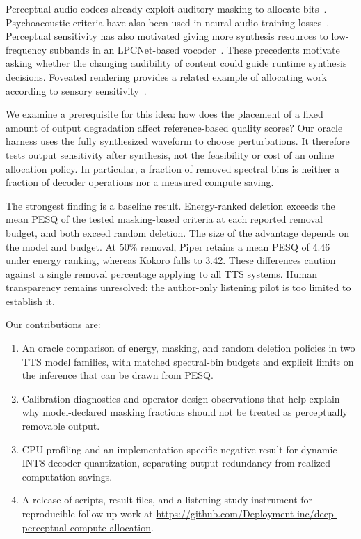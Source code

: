 \documentclass[11pt,a4paper]{article}
\newcommand{\repourl}{https://github.com/Deployment-inc/deep-perceptual-compute-allocation}
\begin{document}
Perceptual audio codecs already exploit auditory masking to allocate bits~\cite{iso11172,painter2000perceptual,zwicker2007psychoacoustics}. Psychoacoustic criteria have also been used in neural-audio training losses~\cite{zhen2018psychoacoustically,zhen2020calibration}. Perceptual sensitivity has also motivated giving more synthesis resources to low-frequency subbands in an LPCNet-based vocoder~\cite{cui2020subband}. These precedents motivate asking whether the changing audibility of content could guide runtime synthesis decisions. Foveated rendering provides a related example of allocating work according to sensory sensitivity~\cite{guenter2012foveated,patney2016foveated,kaplanyan2019deepfovea}.

We examine a prerequisite for this idea: how does the placement of a fixed amount of output degradation affect reference-based quality scores? Our oracle harness uses the fully synthesized waveform to choose perturbations. It therefore tests output sensitivity after synthesis, not the feasibility or cost of an online allocation policy. In particular, a fraction of removed spectral bins is neither a fraction of decoder operations nor a measured compute saving.

The strongest finding is a baseline result. Energy-ranked deletion exceeds the mean PESQ of the tested masking-based criteria at each reported removal budget, and both exceed random deletion. The size of the advantage depends on the model and budget. At 50\% removal, Piper retains a mean PESQ of 4.46 under energy ranking, whereas Kokoro falls to 3.42. These differences caution against a single removal percentage applying to all TTS systems. Human transparency remains unresolved: the author-only listening pilot is too limited to establish it.

Our contributions are:
\begin{enumerate}[leftmargin=*]
\item An oracle comparison of energy, masking, and random deletion policies in two TTS model families, with matched spectral-bin budgets and explicit limits on the inference that can be drawn from PESQ.
\item Calibration diagnostics and operator-design observations that help explain why model-declared masking fractions should not be treated as perceptually removable output.
\item CPU profiling and an implementation-specific negative result for dynamic-INT8 decoder quantization, separating output redundancy from realized computation savings.
\item A release of scripts, result files, and a listening-study instrument for reproducible follow-up work at \url{\repourl}.
\end{enumerate}
\end{document}
